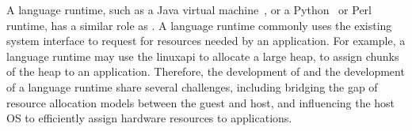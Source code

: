 A language runtime, such as a Java virtual machine~\cite{hotspot,j9,alpern2000jalapeno}, or a Python~\cite{python} or Perl~\cite{perl} runtime,
has a similar role as \thelibos{}.
A language runtime commonly uses the existing system interface
to request for resources needed by an application.
For example, a language runtime may use the  linuxapi{} to allocate a large heap,
to assign chunks of the heap to an application.
Therefore, the development of \thelibos{} and the development of a language runtime share
several challenges,
including bridging the gap of resource allocation models
between the guest and host,
and influencing the host OS to efficiently assign hardware resources to applications.


